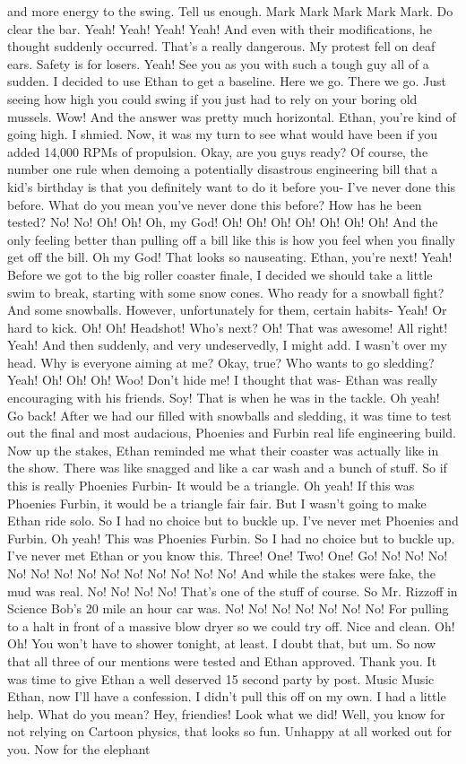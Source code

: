 \documentclass{article}
\begin{document}
and more energy to the swing. Tell us enough. Mark Mark Mark Mark Mark. Do clear the bar. Yeah! Yeah! Yeah! Yeah! And even with their modifications, he thought suddenly occurred. That's a really dangerous. My protest fell on deaf ears. Safety is for losers. Yeah! See you as you with such a tough guy all of a sudden. I decided to use Ethan to get a baseline. Here we go. There we go. Just seeing how high you could swing if you just had to rely on your boring old mussels. Wow! And the answer was pretty much horizontal. Ethan, you're kind of going high. I shmied. Now, it was my turn to see what would have been if you added 14,000 RPMs of propulsion. Okay, are you guys ready? Of course, the number one rule when demoing a potentially disastrous engineering bill that a kid's birthday is that you definitely want to do it before you- I've never done this before. What do you mean you've never done this before? How has he been tested? No! No! Oh! Oh! Oh, my God! Oh! Oh! Oh! Oh! Oh! Oh! Oh! And the only feeling better than pulling off a bill like this is how you feel when you finally get off the bill. Oh my God! That looks so nauseating. Ethan, you're next! Yeah! Before we got to the big roller coaster finale, I decided we should take a little swim to break, starting with some snow cones. Who ready for a snowball fight? And some snowballs. However, unfortunately for them, certain habits- Yeah! Or hard to kick. Oh! Oh! Headshot! Who's next? Oh! That was awesome! All right! Yeah! And then suddenly, and very undeservedly, I might add. I wasn't over my head. Why is everyone aiming at me? Okay, true? Who wants to go sledding? Yeah! Oh! Oh! Oh! Woo! Don't hide me! I thought that was- Ethan was really encouraging with his friends. Soy! That is when he was in the tackle. Oh yeah! Go back! After we had our filled with snowballs and sledding, it was time to test out the final and most audacious, Phoenies and Furbin real life engineering build. Now up the stakes, Ethan reminded me what their coaster was actually like in the show. There was like snagged and like a car wash and a bunch of stuff. So if this is really Phoenies Furbin- It would be a triangle. Oh yeah! If this was Phoenies Furbin, it would be a triangle fair fair. But I wasn't going to make Ethan ride solo. So I had no choice but to buckle up. I've never met Phoenies and Furbin. Oh yeah! This was Phoenies Furbin. So I had no choice but to buckle up. I've never met Ethan or you know this. Three! One! Two! One! Go! No! No! No! No! No! No! No! No! No! No! No! No! No! And while the stakes were fake, the mud was real. No! No! No! No! That's one of the stuff of course. So Mr. Rizzoff in Science Bob's 20 mile an hour car was. No! No! No! No! No! No! No! For pulling to a halt in front of a massive blow dryer so we could try off. Nice and clean. Oh! Oh! You won't have to shower tonight, at least. I doubt that, but um. So now that all three of our mentions were tested and Ethan approved. Thank you. It was time to give Ethan a well deserved 15 second party by post. Music Music Ethan, now I'll have a confession. I didn't pull this off on my own. I had a little help. What do you mean? Hey, friendies! Look what we did! Well, you know for not relying on Cartoon physics, that looks so fun. Unhappy at all worked out for you. Now for the elephant 
\end{document}
